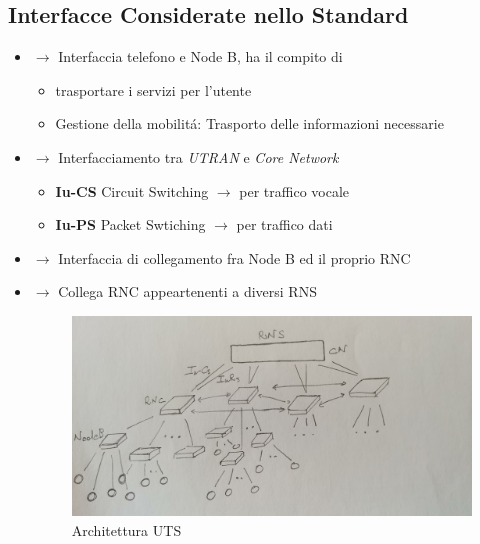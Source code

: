 \documentclass{article}
\begin{document}
\begin{samepage}
\subsection{Interfacce Considerate nello Standard}
\begin{itemize}
    \item {} $\rightarrow$ Interfaccia telefono e Node B, ha il compito di
        \begin{itemize}
            \item trasportare i servizi per l'utente
            \item Gestione della mobilit\'a: Trasporto delle informazioni necessarie
        \end{itemize}
    \item {} $\rightarrow$ Interfacciamento tra \textit{UTRAN} e \textit{Core Network}
        \begin{itemize}
            \item \textbf{Iu-CS} Circuit Switching $\rightarrow$ per traffico vocale
            \item \textbf{Iu-PS} Packet Swtiching $\rightarrow$ per traffico dati
        \end{itemize}
        \item {} $\rightarrow$ Interfaccia di collegamento fra Node B ed il proprio RNC
        \item {} $\rightarrow$ Collega RNC appeartenenti a diversi RNS
            \begin{figure}[h]
                \centering
                \includegraphics[width=6in]{img/architettura_uts.jpg}
                \caption{Architettura UTS}
            \end{figure}

\end{itemize}

\end{samepage}
\end{document}
